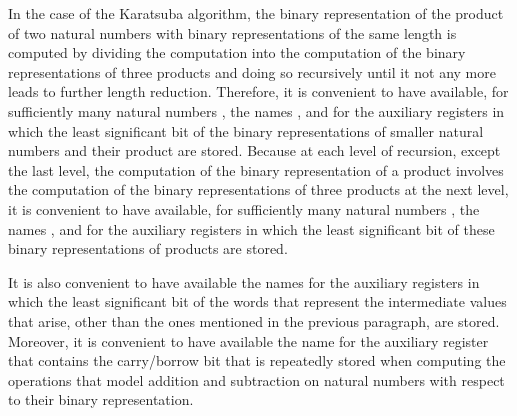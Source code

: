 \documentclass{llncs}
\begin{document}
In the case of the Karatsuba algorithm, the binary representation of the 
product of two natural numbers with binary representations of the same 
length is computed by dividing the computation into the computation of 
the binary representations of three products and doing so recursively 
until it not any more leads to further length reduction. 
Therefore, it is convenient to have available, for sufficiently many 
natural numbers , the names ,  and  for the 
auxiliary registers in which the least significant bit of the binary
representations of smaller natural numbers and their product are stored. 
Because at each level of recursion, except the last level, the 
computation of the binary representation of a product involves the 
computation of the binary representations of three products at the next 
level, it is convenient to have available, for sufficiently many natural 
numbers , the names ,  and  for the auxiliary 
registers in which the least significant bit of these binary 
representations of products are stored. 

It is also convenient to have available the names  for 
the auxiliary registers in which the least significant bit of the words 
that represent the intermediate values that arise, other than the ones 
mentioned in the previous paragraph, are stored.
Moreover, it is convenient to have available the name  for the 
auxiliary register that contains the carry/borrow bit that is repeatedly 
stored when computing the operations that model addition and subtraction 
on natural numbers with respect to their binary representation.
\end{document}
